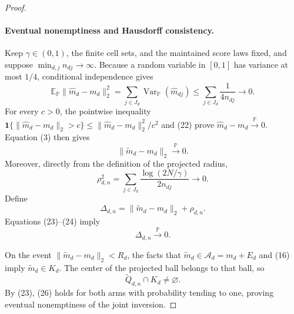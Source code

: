 \documentclass{article}
\begin{document}
\begin{proof}
\paragraph{Eventual nonemptiness and Hausdorff consistency.}
Keep \(\gamma\in(0,1)\), the finite cell sets, and the maintained score laws fixed, and suppose \(\min_{d,j}n_{dj}\to\infty\).  Because a random variable in \([0,1]\) has variance at most \(1/4\), conditional independence gives
\[
 \mathbb E_{\mathbb P}\|\widehat m_d-m_d\|_2^2
 =\sum_{j\in J_d}\operatorname{Var}_{\mathbb P}(\widehat m_{dj})
 \leq\sum_{j\in J_d}\frac{1}{4n_{dj}}
 \longrightarrow0.                                        \tag{22}
\]
For every \(c>0\), the pointwise inequality
\(\mathbf 1\{\|\widehat m_d-m_d\|_2>c\}
 \leq\|\widehat m_d-m_d\|_2^2/c^2\)
and (22) prove \(\widehat m_d-m_d\xrightarrow{\mathbb P}0\).  Equation (3) then gives
\[
 \|\widetilde m_d-m_d\|_2\xrightarrow{\mathbb P}0.        \tag{23}
\]
Moreover, directly from the definition of the projected radius,
\[
 \rho_{d,n}^{2}
 =\sum_{j\in J_d}\frac{\log(2N/\gamma)}{2n_{dj}}
 \longrightarrow0.                                        \tag{24}
\]
Define
\[
 \Delta_{d,n}=\|\widetilde m_d-m_d\|_2+\rho_{d,n}.
\]
Equations (23)--(24) imply
\[
 \Delta_{d,n}\xrightarrow{\mathbb P}0.                   \tag{25}
\]

On the event \(\|\widetilde m_d-m_d\|_2<R_d\), the facts that \(\widetilde m_d\in\mathcal A_d=m_d+E_d\) and (16) imply \(\widetilde m_d\in K_d\).  The center of the projected ball belongs to that ball, so
\[
 \widetilde Q_{d,n}\cap K_d\neq\varnothing.               \tag{26}
\]
By (23), (26) holds for both arms with probability tending to one, proving eventual nonemptiness of the joint inversion.


\end{proof}
\end{document}
